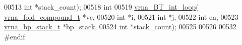 \begin{DoxyCode}
00513               \textcolor{keywordtype}{int} *stack\_count);
00518 \textcolor{keywordtype}{int}
00519 \hyperlink{group__loops_ga849b7dc373b6c0b029672e16a7e52053}{vrna\_BT\_int\_loop}( \hyperlink{group__fold__compound_structvrna__fc__s}{vrna\_fold\_compound\_t} *vc,
00520                   \textcolor{keywordtype}{int} *i,
00521                   \textcolor{keywordtype}{int} *j,
00522                   \textcolor{keywordtype}{int} en,
00523                   \hyperlink{group__data__structures_structvrna__bp__stack__s}{vrna\_bp\_stack\_t} *bp\_stack,
00524                   \textcolor{keywordtype}{int} *stack\_count);
00525 
00526 
00532 \textcolor{preprocessor}{#endif}
\end{DoxyCode}
